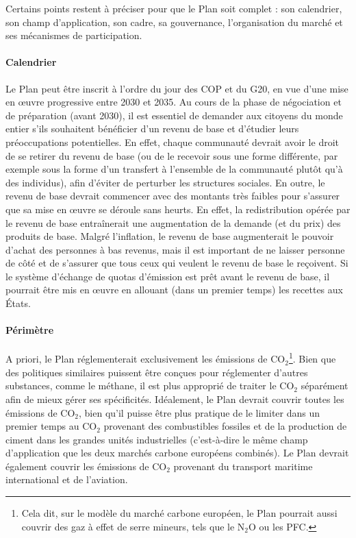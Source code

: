 \documentclass[a5paper,french]{memoir}
\begin{document}
Certains points restent à préciser pour que le Plan soit complet : son calendrier, son champ d'application, son cadre, sa gouvernance, l'organisation du marché et ses mécanismes de participation. 

\paragraph{Calendrier} 
Le Plan peut être inscrit à l'ordre du jour des COP et du G20, en vue d'une mise en œuvre progressive entre 2030 et 2035. Au cours de la phase de négociation et de préparation (avant 2030), il est essentiel de demander aux citoyens du monde entier s'ils souhaitent bénéficier d'un revenu de base et d'étudier leurs préoccupations potentielles. En effet, chaque communauté devrait avoir le droit de se retirer du revenu de base (ou de le recevoir sous une forme différente, par exemple sous la forme d'un transfert à l'ensemble de la communauté plutôt qu'à des individus), afin d'éviter de perturber les structures sociales. En outre, le revenu de base devrait commencer avec des montants très faibles pour s'assurer que sa mise en œuvre se déroule sans heurts. En effet, la redistribution opérée par le revenu de base entraînerait une augmentation de la demande (et du prix) des produits de base. Malgré l'inflation, le revenu de base augmenterait le pouvoir d'achat des personnes à bas revenus, mais il est important de ne laisser personne de côté et de s'assurer que tous ceux qui veulent le revenu de base le reçoivent. Si le système d'échange de quotas d'émission est prêt avant le revenu de base, il pourrait être mis en œuvre en allouant (dans un premier temps) les recettes aux États.

\paragraph{Périmètre} 
A priori, le Plan réglementerait exclusivement les émissions de CO$_\text{2}$\footnote{Cela dit, sur le modèle du marché carbone européen, le Plan pourrait aussi couvrir des gaz à effet de serre mineurs, tels que le N$_\text{2}$O ou les PFC.}. Bien que des politiques similaires puissent être conçues pour réglementer d'autres substances, comme le méthane, il est plus approprié de traiter le CO$_\text{2}$ séparément afin de mieux gérer ses spécificités. Idéalement, le Plan devrait couvrir toutes les émissions de CO$_\text{2}$, bien qu'il puisse être plus pratique de le limiter dans un premier temps au CO$_\text{2}$ provenant des combustibles fossiles et de la production de ciment dans les grandes unités industrielles (c'est-à-dire le même champ d'application que les deux marchés carbone européens combinés). Le Plan devrait également couvrir les émissions de CO$_\text{2}$ provenant du transport maritime international et de l'aviation. 
\end{document}
